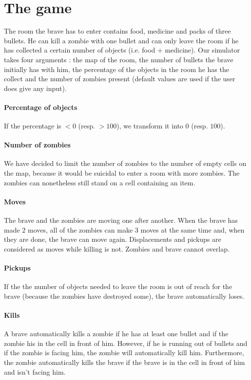 \documentclass[11pt,a4paper]{article}
\begin{document}
\section*{The game}

The room the brave has to enter contains food, medicine and packs of three bullets. He can kill a zombie with one bullet and can only leave the room if he has collected a certain number of objects (i.e. food + medicine). Our simulator takes four arguments : the map of the room, the number of bullets the brave initially has with him, the percentage of the objects in the room he has the collect and the number of zombies present (default values are used if the user does give any input).

\paragraph{Percentage of objects} If the percentage is $< 0$ (resp. $ > 100$), we transform it into $0$ (resp. $100$).

\paragraph{Number of zombies} We have decided to limit the number of zombies to the number of empty cells on the map, because it would be suicidal to enter a room with more zombies. The zombies can nonetheless still stand on a cell containing an item. 

\paragraph{Moves} The brave and the zombies are moving one after another. When the brave has made $2$ moves, all of the zombies can make $3$ moves at the same time and, when they are done, the brave can move again. Displacements and pickups are considered as moves while killing is not. Zombies and brave cannot overlap.

\paragraph{Pickups} If the the number of objects needed to leave the room is out of reach for the brave (because the zombies have destroyed some), the brave automatically loses. 

\paragraph{Kills} \label {kills} A brave automatically kills a zombie if he has at least one bullet and if the zombie his in the cell in front of him. However, if he is running out of bullets and if the zombie is facing him, the zombie will automatically kill him. Furthermore, the zombie automatically kills the brave if the brave is in the cell in front of him and isn't facing him.
\end{document}
